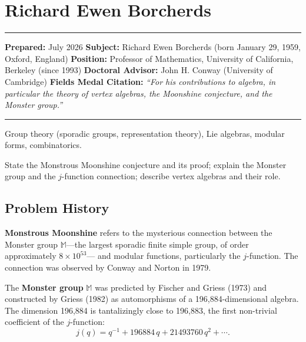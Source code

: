 \chapter{Richard Ewen Borcherds}\label{ch1998richardborcherds:richard-ewen-borcherds-fields-medal-1998-a-comprehensive-report-on-his-work-and-impact}

\begin{center}\rule{0.5\linewidth}{0.5pt}\end{center}

\textbf{Prepared:} July 2026
\textbf{Subject:} Richard Ewen Borcherds (born January 29, 1959, Oxford, England)
\textbf{Position:} Professor of Mathematics, University of California, Berkeley (since 1993)
\textbf{Doctoral Advisor:} John H. Conway (University of Cambridge)
\textbf{Fields Medal Citation:} \emph{``For his contributions to algebra, in
particular the theory of vertex algebras, the Moonshine conjecture,
and the Monster group.''}

\begin{center}\rule{0.5\linewidth}{0.5pt}\end{center}

\begin{prereqs}
Group theory (sporadic groups, representation theory),
Lie algebras, modular forms, combinatorics.
\end{prereqs}

\begin{objectives}
State the Monstrous Moonshine conjecture and its proof; explain the
Monster group and the $j$-function connection; describe vertex
algebras and their role.
\end{objectives}

\section{Problem History}

\textbf{Monstrous Moonshine} refers to the mysterious connection
between the Monster group $\mathbb{M}$---the largest sporadic
finite simple group, of order approximately $8\times 10^{53}$---
and modular functions, particularly the $j$-function.  The
connection was observed by Conway and Norton in 1979.

The \textbf{Monster group} $\mathbb{M}$ was predicted by Fischer
and Griess (1973) and constructed by Griess (1982) as
automorphisms of a 196,884-dimensional algebra.  The dimension
196,884 is tantalizingly close to 196,883, the first non-trivial
coefficient of the $j$-function:
\[
  j(q) = q^{-1} + 196884\,q + 21493760\,q^2 + \cdots.
\]

